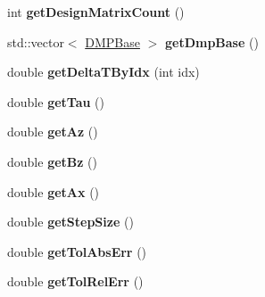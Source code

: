 \begin{DoxyCompactItemize}
\item 
int {\bfseries get\+Design\+Matrix\+Count} ()\hypertarget{classkukadu_1_1Dmp_aaa2bbfc5b9683d38c7dc3cae4fd66d35}{}\label{classkukadu_1_1Dmp_aaa2bbfc5b9683d38c7dc3cae4fd66d35}

\item 
std\+::vector$<$ \hyperlink{classkukadu_1_1DMPBase}{D\+M\+P\+Base} $>$ {\bfseries get\+Dmp\+Base} ()\hypertarget{classkukadu_1_1Dmp_a22ef512c5a0fb56808212c18eeabb4f6}{}\label{classkukadu_1_1Dmp_a22ef512c5a0fb56808212c18eeabb4f6}

\item 
double {\bfseries get\+Delta\+T\+By\+Idx} (int idx)\hypertarget{classkukadu_1_1Dmp_a1ec31b0b369dac93fe7b4913ab8863db}{}\label{classkukadu_1_1Dmp_a1ec31b0b369dac93fe7b4913ab8863db}

\item 
double {\bfseries get\+Tau} ()\hypertarget{classkukadu_1_1Dmp_a787076c787e247bc14c07e738617e5f6}{}\label{classkukadu_1_1Dmp_a787076c787e247bc14c07e738617e5f6}

\item 
double {\bfseries get\+Az} ()\hypertarget{classkukadu_1_1Dmp_aaec08d60cac323f41ffdad60c0218ea9}{}\label{classkukadu_1_1Dmp_aaec08d60cac323f41ffdad60c0218ea9}

\item 
double {\bfseries get\+Bz} ()\hypertarget{classkukadu_1_1Dmp_a25805f30ba5af184d2cb3f228d74bc47}{}\label{classkukadu_1_1Dmp_a25805f30ba5af184d2cb3f228d74bc47}

\item 
double {\bfseries get\+Ax} ()\hypertarget{classkukadu_1_1Dmp_afecc2e30b16281ae8e46fbd0797ba9da}{}\label{classkukadu_1_1Dmp_afecc2e30b16281ae8e46fbd0797ba9da}

\item 
double {\bfseries get\+Step\+Size} ()\hypertarget{classkukadu_1_1Dmp_aa88cf46b01a29848c307ab8c66cd3c1e}{}\label{classkukadu_1_1Dmp_aa88cf46b01a29848c307ab8c66cd3c1e}

\item 
double {\bfseries get\+Tol\+Abs\+Err} ()\hypertarget{classkukadu_1_1Dmp_ae72973627e7443f6b98b07891fba2705}{}\label{classkukadu_1_1Dmp_ae72973627e7443f6b98b07891fba2705}

\item 
double {\bfseries get\+Tol\+Rel\+Err} ()\hypertarget{classkukadu_1_1Dmp_a8a90b4bf9c8acf5a3aeaeb2c82671929}{}\label{classkukadu_1_1Dmp_a8a90b4bf9c8acf5a3aeaeb2c82671929}


\end{DoxyCompactItemize}
